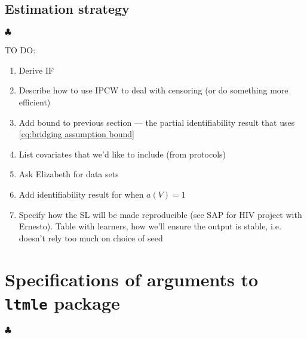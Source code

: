 \documentclass[12pt]{article}
\theoremstyle{definition}
\newcommand\independent{\protect\mathpalette{\protect\independenT}{\perp}}
\def\independenT#1#2{\mathrel{\rlap{$#1#2$}\mkern2mu{#1#2}}}
\DeclareMathOperator{\cE}{\mathbb{E}}
\newcommand{\Hopen}{V}
\begin{document}

\subsection{Estimation strategy}
$\clubsuit$

TO DO:
\begin{enumerate}
    \item Derive IF
    \item Describe how to use IPCW to deal with censoring (or do something more efficient)
    \item \checkmark Add bound to previous section --- the partial identifiability result that uses \eqref{eq:bridging assumption bound}
    \item List covariates that we'd like to include (from protocols)
    \item \checkmark Ask Elizabeth for data sets
    \item \checkmark Add identifiability result for when $a(V)=1$
    \item \checkmark Specify how the SL will be made reproducible (see SAP for HIV project with Ernesto). Table with learners, how we'll ensure the output is stable, i.e. doesn't rely too much on choice of seed
\end{enumerate}

\newpage
\appendix
\section{Specifications of arguments to \texttt{ltmle} package}
$\clubsuit$
\end{document}
